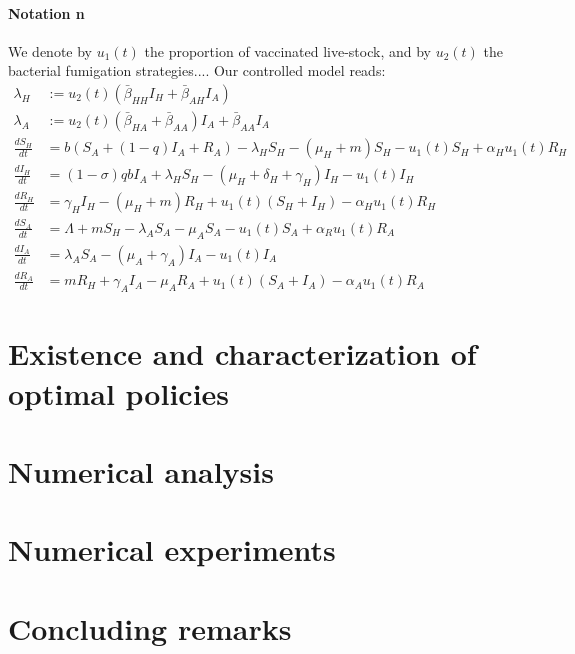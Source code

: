 \documentclass[11pt]{amsart}
\theoremstyle{definition}
\numberwithin{equation}{section}
\begin{document}
    \paragraph{Notation n}
    We denote by $u_1(t)$ the proportion of vaccinated live-stock,
    and by $u_2(t)$ the bacterial fumigation strategies....
    Our controlled model reads:
    \begin{equation}
    \begin{aligned}
        \lambda_H &:= u_2(t) (\bar{\beta}_{HH} I_H + \bar{\beta}_{AH} I_A)
        \\
        \lambda_A &:= 
            u_2(t)(\bar{\beta}_{HA} + \bar{\beta}_{AA}) I_A
        + \bar{\beta}_{AA} I_A
        \\
        \frac{d S_H}{dt} &=
        b (S_A + (1 - q) I_A + R_A)
        -\lambda_H S_H - (\mu_H + m) S_H 
        - u_1(t)  S_H + \alpha_H u_1(t) R_H
        \\
        \frac{d I_H}{dt} &=
        (1 - \sigma)  q  b  I_A
        + \lambda_H S_H - (\mu_H + \delta_H + \gamma_H)I_H
        - u_1(t) I_H
        \\
        \frac{d R_H}{dt} &=
        \gamma_H I_H - (\mu_H + m) R_H
        + u_1(t) (S_H + I_H) - \alpha_H u_1(t) R_H
        \\
        \frac{dS_A}{dt} &=
        \Lambda + m S_H - \lambda_A S_A - \mu_A S_A
        - u_1(t) S_A + \alpha_R u_1(t) R_A
        \\
        \frac{d I_A}{dt} &=
        \lambda_A S_A - (\mu_A + \gamma_A)   I_A
        - u_1(t) I_A
        \\
        \frac{dR_A}{dt} &=
        m R_H + \gamma_A I_A - \mu_A R_A
        + u_1(t) (S_A + I_A) - \alpha_A u_1(t) R_A
    \end{aligned}
\end{equation}    
    

    \section{Existence and characterization of optimal policies}
    \section{Numerical analysis}
    \section{Numerical experiments}
    \section{Concluding remarks}
%
%  
%  
\end{document}
